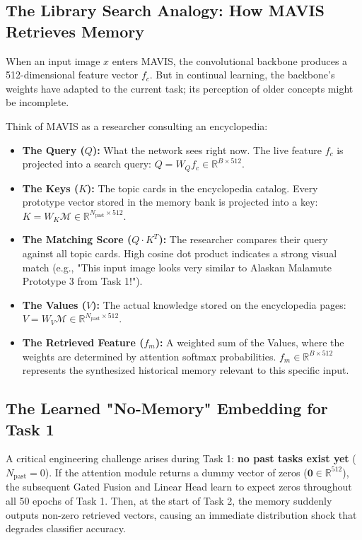 \documentclass[11pt,a4paper]{article}
\begin{document}
\subsection{The Library Search Analogy: How MAVIS Retrieves Memory}
When an input image $x$ enters MAVIS, the convolutional backbone produces a 512-dimensional feature vector $f_c$. But in continual learning, the backbone's weights have adapted to the current task; its perception of older concepts might be incomplete.

Think of MAVIS as a researcher consulting an encyclopedia:
\begin{itemize}[leftmargin=*]
    \item \textbf{The Query ($Q$):} What the network sees right now. The live feature $f_c$ is projected into a search query: $Q = W_Q f_c \in \mathbb{R}^{B \times 512}$.
    \item \textbf{The Keys ($K$):} The topic cards in the encyclopedia catalog. Every prototype vector stored in the memory bank is projected into a key: $K = W_K \mathcal{M} \in \mathbb{R}^{N_{\text{past}} \times 512}$.
    \item \textbf{The Matching Score ($Q \cdot K^T$):} The researcher compares their query against all topic cards. High cosine dot product indicates a strong visual match (e.g., "This input image looks very similar to Alaskan Malamute Prototype 3 from Task 1!").
    \item \textbf{The Values ($V$):} The actual knowledge stored on the encyclopedia pages: $V = W_V \mathcal{M} \in \mathbb{R}^{N_{\text{past}} \times 512}$.
    \item \textbf{The Retrieved Feature ($f_m$):} A weighted sum of the Values, where the weights are determined by attention softmax probabilities. $f_m \in \mathbb{R}^{B \times 512}$ represents the synthesized historical memory relevant to this specific input.
\end{itemize}

\subsection{The Learned "No-Memory" Embedding for Task 1}
A critical engineering challenge arises during Task 1: \textbf{no past tasks exist yet} ($N_{\text{past}} = 0$). If the attention module returns a dummy vector of zeros ($\mathbf{0} \in \mathbb{R}^{512}$), the subsequent Gated Fusion and Linear Head learn to expect zeros throughout all 50 epochs of Task 1. Then, at the start of Task 2, the memory suddenly outputs non-zero retrieved vectors, causing an immediate distribution shock that degrades classifier accuracy.
\end{document}
